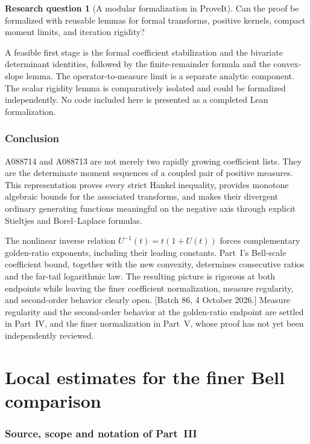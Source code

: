\documentclass[11pt]{article}
\numberwithin{equation}{section}
\theoremstyle{definition}
\newtheorem{question}[theorem]{Research question}
\theoremstyle{remark}
\begin{document}
\begin{question}[A modular formalization in ProveIt]
Can the proof be formalized with reusable lemmas for formal transforms,
positive kernels, compact moment limits, and iteration rigidity?
\end{question}
A feasible first stage is the formal coefficient stabilization and the
bivariate determinant identities, followed by the finite-remainder formula
and the convex-slope lemma. The operator-to-measure limit is a separate
analytic component. The scalar rigidity lemma is comparatively isolated
and could be formalized independently. No code included here is presented
as a completed Lean formalization.

\section{Conclusion}
A088714 and A088713 are not merely two rapidly growing coefficient lists.
They are the determinate moment sequences of a coupled pair of positive
measures. This representation proves every strict Hankel inequality,
provides monotone algebraic bounds for the associated transforms, and
makes their divergent ordinary generating functions meaningful on the
negative axis through explicit Stieltjes and Borel--Laplace formulas.

The nonlinear inverse relation $U^{-1}(t)=t(1+U(t))$ forces complementary
golden-ratio exponents, including their leading constants. Part~I's
Bell-scale coefficient bound, together with the new convexity, determines
consecutive ratios and the far-tail logarithmic law. The resulting picture
is rigorous at both endpoints while leaving the finer coefficient
normalization, measure regularity, and second-order behavior clearly open.
[Batch 86, 4 October 2026.] Measure regularity and the second-order behavior at the
golden-ratio endpoint are settled in Part~IV, and the finer normalization
in Part~V, whose proof has not yet been independently reviewed.

\clearpage
\part{Local estimates for the finer Bell comparison}\label{ble:part}

\section{Source, scope and notation of Part~III}\label{ble:sec:source}
\end{document}
